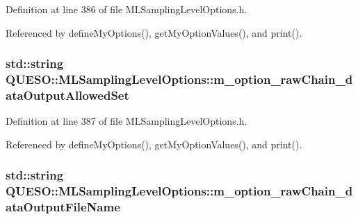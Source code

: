 Definition at line 386 of file M\-L\-Sampling\-Level\-Options.\-h.



Referenced by define\-My\-Options(), get\-My\-Option\-Values(), and print().

\hypertarget{class_q_u_e_s_o_1_1_m_l_sampling_level_options_ad7b34b44ea9dcfbf9092167bdb9d4ecb}{
\subsubsection[{m\-\_\-option\-\_\-raw\-Chain\-\_\-data\-Output\-Allowed\-Set}]{\setlength{\rightskip}{0pt plus 5cm}std\-::string Q\-U\-E\-S\-O\-::\-M\-L\-Sampling\-Level\-Options\-::m\-\_\-option\-\_\-raw\-Chain\-\_\-data\-Output\-Allowed\-Set\hspace{0.3cm}{\ttfamily [private]}}}\label{class_q_u_e_s_o_1_1_m_l_sampling_level_options_ad7b34b44ea9dcfbf9092167bdb9d4ecb}


Definition at line 387 of file M\-L\-Sampling\-Level\-Options.\-h.



Referenced by define\-My\-Options(), get\-My\-Option\-Values(), and print().

\hypertarget{class_q_u_e_s_o_1_1_m_l_sampling_level_options_ad1d736cccbf3be64e1998c18ead26630}{
\subsubsection[{m\-\_\-option\-\_\-raw\-Chain\-\_\-data\-Output\-File\-Name}]{\setlength{\rightskip}{0pt plus 5cm}std\-::string Q\-U\-E\-S\-O\-::\-M\-L\-Sampling\-Level\-Options\-::m\-\_\-option\-\_\-raw\-Chain\-\_\-data\-Output\-File\-Name\hspace{0.3cm}{\ttfamily [private]}}}\label{class_q_u_e_s_o_1_1_m_l_sampling_level_options_ad1d736cccbf3be64e1998c18ead26630}


